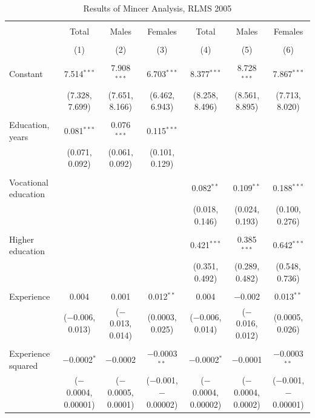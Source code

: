 \documentclass[alpha-refs]{wiley-article-01g}
\begin{document}
\begin{landscape}

\fontsize{9}{11}
\selectfont

\begin{table}[!htbp] \centering 
\renewcommand{\arraystretch}{1.0}
  \caption{Results of Mincer Analysis, RLMS 2005} 
  \label{} 
\begin{tabular}{@{\extracolsep{5pt}}lcccccc} 
\\[-1.8ex]\hline 
\hline \\[-1.8ex] 
 & Total & Males & Females & Total & Males & Females \\ 
\\[-1.8ex] & (1) & (2) & (3) & (4) & (5) & (6)\\ 
\hline \\[-1.8ex] 
 Constant & 7.514$^{***}$ & 7.908$^{***}$ & 6.703$^{***}$ & 8.377$^{***}$ & 8.728$^{***}$ & 7.867$^{***}$ \\ 
  & (7.328, 7.699) & (7.651, 8.166) & (6.462, 6.943) & (8.258, 8.496) & (8.561, 8.895) & (7.713, 8.020) \\ 
  & & & & & & \\ 
 Education, years & 0.081$^{***}$ & 0.076$^{***}$ & 0.115$^{***}$ &  &  &  \\ 
  & (0.071, 0.092) & (0.061, 0.092) & (0.101, 0.129) &  &  &  \\ 
  & & & & & & \\ 
 Vocational education &  &  &  & 0.082$^{**}$ & 0.109$^{**}$ & 0.188$^{***}$ \\ 
  &  &  &  & (0.018, 0.146) & (0.024, 0.193) & (0.100, 0.276) \\ 
  & & & & & & \\ 
 Higher education &  &  &  & 0.421$^{***}$ & 0.385$^{***}$ & 0.642$^{***}$ \\ 
  &  &  &  & (0.351, 0.492) & (0.289, 0.482) & (0.548, 0.736) \\ 
  & & & & & & \\ 
 Experience & 0.004 & 0.001 & 0.012$^{**}$ & 0.004 & $-$0.002 & 0.013$^{**}$ \\ 
  & ($-$0.006, 0.013) & ($-$0.013, 0.014) & (0.0003, 0.025) & ($-$0.006, 0.014) & ($-$0.016, 0.012) & (0.0005, 0.026) \\ 
  & & & & & & \\ 
 Experience squared & $-$0.0002$^{*}$ & $-$0.0002 & $-$0.0003$^{**}$ & $-$0.0002$^{*}$ & $-$0.0001 & $-$0.0003$^{**}$ \\ 
  & ($-$0.0004, 0.00001) & ($-$0.0005, 0.0001) & ($-$0.001, $-$0.00002) & ($-$0.0004, 0.00002) & ($-$0.0004, 0.0002) & ($-$0.001, $-$0.00001) \\ 

\end{tabular}
\end{table}
\end{landscape}
\end{document}
